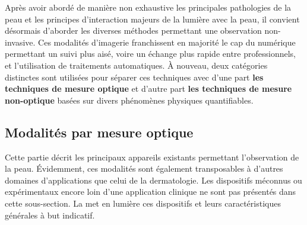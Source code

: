 Après avoir abordé de manière non exhaustive les principales pathologies de la peau et les principes d'interaction majeurs de la lumière avec la peau, il convient désormais d'aborder les diverses méthodes permettant une observation non-invasive. Ces modalités d'imagerie franchissent en majorité le cap du numérique permettant un suivi plus aisé, voire un échange plus rapide entre professionnels, et l’utilisation de traitements automatiques. À nouveau, deux catégories distinctes sont utilisées pour séparer ces techniques avec d’une part \textbf{les techniques de mesure optique} et d'autre part \textbf{les techniques de mesure non-optique} basées sur divers phénomènes physiques quantifiables.\par

\subsection{Modalités par mesure optique}
Cette partie décrit les principaux appareils existants permettant l'observation de la peau. Évidemment, ces modalités sont également transposables à d'autres domaines d'applications que celui de la dermatologie. Les dispositifs méconnus ou expérimentaux encore loin d'une application clinique ne sont pas présentés dans cette sous-section. La  met en lumière ces dispositifs et leurs caractéristiques générales à but indicatif.\par

